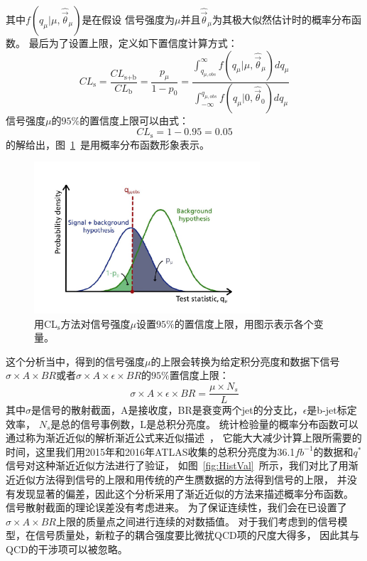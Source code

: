 其中$ f\left(   q_{\mu}|\mu, \hat{\vec{\theta}}_{\mu}   \right) $是在假设
信号强度为$\mu$并且$\hat{\vec{\theta}}_{\mu}$为其极大似然估计时的概率分布函数。
最后为了设置上限，定义如下置信度计算方式：
\begin{equation} 
\label{eq:Limit6}
CL_\text{s}=\frac{CL_\text{s+b}}{CL_\text{b}}=\frac{p_{\mu}}{1-p_0}=
\frac{\int^{\infty}_{q_{\mu,obs}} f\left(   q_{\mu}|\mu, \hat{\vec{\theta}}_{\mu}   \right) dq_{\mu}}
{\int_{-\infty}^{q_{\mu,obs}} f\left(   q_{\mu}|0, \hat{\vec{\theta}}_0  \right) dq_{\mu}}
\end{equation}
信号强度$\mu$的$95\%$的置信度上限可以由式：
\begin{equation} 
\label{eq:Limit7}
CL_\text{s}=1-0.95=0.05
\end{equation}
的解给出，图~\ref{fig:CLs}~是用概率分布函数形象表示。

\begin{figure}[!ht]
        \centering
                \includegraphics[width=0.75\textwidth]{figuresDijet/10-LimitSettingResults/CLs.jpg}
        \caption{用CL$_\text{s}$方法对信号强度$\mu$设置$95\%$的置信度上限，用图示表示各个变量。}
        \label{fig:CLs}
\end{figure}


这个分析当中，得到的信号强度$\mu$的上限会转换为给定积分亮度和数据下信号$\sigma\times A \times BR$或者$\sigma\times A \times \epsilon \times BR$的$95\%$置信度上限：
\begin{equation} 
\label{eq:Limit8}
\sigma\times A \times \epsilon \times BR =\frac{\mu\times N_s}{L}
\end{equation}
其中$\sigma$是信号的散射截面，A是接收度，BR是衰变两个jet的分支比，$\epsilon$是b-jet标定效率，
$N_s$是总的信号事例数，L是总积分亮度。
统计检验量的概率分布函数可以通过称为渐近近似的解析渐近公式来近似描述~\cite{Cowan:2010js}，
它能大大减少计算上限所需要的时间，这里我们用2015年和2016年ATLAS收集的总积分亮度为36.1$fb^{-1}$的数据和$q^*$信号对这种渐近近似方法进行了验证，
如图~\ref{fig:HistVal}~所示，我们对比了用渐近近似方法得到信号的上限和用传统的产生赝数据的方法得到信号的上限，
并没有发现显著的偏差，因此这个分析采用了渐近近似的方法来描述概率分布函数。
信号散射截面的理论误差没有考虑进来。
为了保证连续性，我们会在已设置了$\sigma\times A \times BR$上限的质量点之间进行连续的对数插值。
对于我们考虑到的信号模型，在信号质量处，新粒子的耦合强度要比微扰QCD项的尺度大得多，
因此其与QCD的干涉项可以被忽略。

